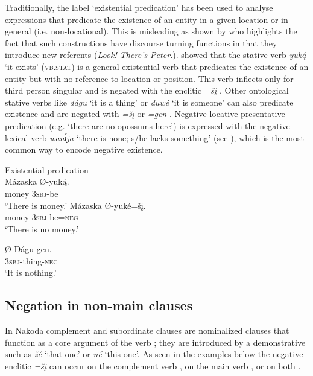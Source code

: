 \documentclass[output=paper,colorlinks,citecolor=brown]{langscibook}
\begin{document}
Traditionally, the label ‘existential predication’ has been used to analyse expressions that predicate the existence of an entity in a given location or in general (i.e. non-locational). This is misleading as shown by \citet{Creissels2014} who highlights the fact that such constructions have discourse turning functions in that they introduce new referents (\textit{Look! There’s Peter.}). \citet[256]{Cumberland2005} showed that the stative verb \textit{yuk\'{ą}} ‘it exists’ (\textsc{vb.stat}) is a general existential verb that predicates the existence of an entity but with no reference to location or position. This verb inflects only for third person singular and is negated with the enclitic \textit{=šį} . Other ontological stative verbs like \textit{dágu} ‘it is a thing’ or \textit{duwé} ‘it is someone’ can also predicate existence and are negated with \textit{=šį} or \textit{=gen} . Negative locative-presentative predication (e.g. ‘there are no opossums here’) is expressed with the negative lexical verb \textit{wan\'{\k{ı}}ja} ‘there is none; s/he lacks something’ (see ), which is the most common way to encode negative existence.

\ea\label{ex:nak:29}{Existential predication}\\
    \ea\label{ex:nak:29a}
        \gll Mázaska Ø-yuk\'{ą}. \\ 
             money \textsc{3sbj}-be \\
        \glt ‘There is money.’
    \ex\label{ex:nak:29b}
        \gll Mázaska Ø-yuké=šį. \\
             money \textsc{3sbj}-be=\textsc{neg} \\
        \glt ‘There is no money.’
    \z
\z

\ea\label{ex:nak:30}
    \gll Ø-Dágu-gen. \\ 
         \textsc{3sbj}-thing-\textsc{neg} \\
    \glt ‘It is nothing.’
\z 

\subsection{Negation in non-main clauses}\label{sec:nak:2.4}

In Nakoda complement and subordinate clauses are nominalized clauses that function as a core argument of the verb \citep[415]{Cumberland2005}; they are introduced by a demonstrative such as \textit{žé} ‘that one’ or \textit{né} ‘this one’. As seen in the examples below the negative enclitic \textit{=šį} can occur on the complement verb , on the main verb , or on both .
\end{document}

